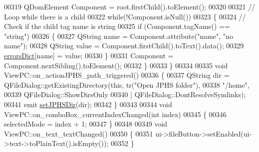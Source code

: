 \begin{DoxyCode}
00319     QDomElement Component = root.firstChild().toElement();
00320 
00321     \textcolor{comment}{// Loop while there is a child}
00322     \textcolor{keywordflow}{while}(!Component.isNull())
00323     \{
00324         \textcolor{comment}{// Check if the child tag name is string}
00325         \textcolor{keywordflow}{if} (Component.tagName() == \textcolor{stringliteral}{"string"})
00326         \{
00327             QString name = Component.attribute(\textcolor{stringliteral}{"name"}, \textcolor{stringliteral}{"no name"});
00328             QString value = Component.firstChild().toText().data();
00329             \hyperlink{class_view_p_c_aaf7f058e5589d65fec72a21abfd5629b}{errorsDict}[name] = value;
00330         \}
00331         Component = Component.nextSibling().toElement();
00332     \}
00333 \}
00334 
00335 \textcolor{keywordtype}{void} ViewPC::on\_actionJPHS\_path\_triggered()
00336 \{
00337     QString dir = QFileDialog::getExistingDirectory(\textcolor{keyword}{this}, tr(\textcolor{stringliteral}{"Open JPHS folder"}),
00338                                                     \textcolor{stringliteral}{"/home"},
00339                                                     QFileDialog::ShowDirsOnly
00340                                                     | QFileDialog::DontResolveSymlinks);
00341     emit \hyperlink{class_view_p_c_ae81085836c0c01bc9556a5b27eb8d19c}{setJPHSDir}(dir);
00342 \}
00343 
00344 \textcolor{keywordtype}{void} ViewPC::on\_comboBox\_currentIndexChanged(\textcolor{keywordtype}{int} index)
00345 \{
00346     selectedMode = index + 1;
00347 \}
00348 
00349 \textcolor{keywordtype}{void} ViewPC::on\_text\_textChanged()
00350 \{
00351     ui->fileButton->setEnabled(ui->text->toPlainText().isEmpty());
00352 \}
\end{DoxyCode}
